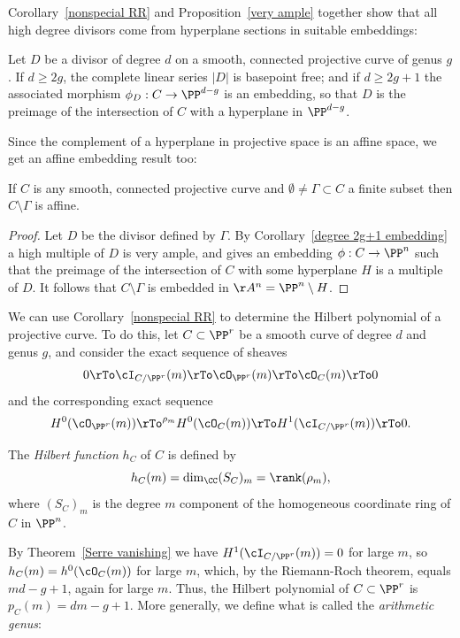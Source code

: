 Corollary~\ref{nonspecial RR} and Proposition~\ref{very ample} together show that all high degree divisors come from hyperplane sections in 
suitable embeddings:

\begin{corollary}\label{degree 2g+1 embedding}
Let $D$ be a divisor of degree $d$ on a smooth, connected projective curve of genus $g$. If $d \geq 2g$, the complete linear series $|D|$ is basepoint free; and if $d \geq 2g+1$ the associated morphism $\phi_D : C \to \PP^{d-g}$ is an embedding, so that
$D$ is the preimage of the intersection of $C$ with a hyperplane in $ \PP^{d-g}$.
\end{corollary}

Since the complement of a hyperplane in projective space is an affine space, we get an affine embedding result too:

\begin{corollary}
 If $C$ is any smooth, connected projective curve and $\emptyset \neq \Gamma \subset C$ a finite subset then $C \setminus \Gamma$ is affine.
\end{corollary}
\begin{proof}
Let $D$ be the divisor defined by $\Gamma$. By Corollary~\ref{degree 2g+1 embedding} a high multiple of $D$ is very ample,
and gives an embedding $\phi: C\to \PP^n$ such that the preimage of the intersection of $C$ with some hyperplane $H$
is a multiple of $D$. It follows that $C\setminus \Gamma$ is embedded in $\AA^n = \PP^n\setminus H$.
\end{proof}
 
We can  use Corollary~\ref{nonspecial RR} to determine the Hilbert polynomial of a projective curve. To do this, let $C \subset \PP^r$ be a smooth curve of degree $d$ and genus $g$, and consider the exact sequence of sheaves
$$
0 \rTo \cI_{C/\PP^r}(m) \rTo \cO_{\PP^r}(m) \rTo \cO_C(m) \rTo 0
$$
and the corresponding exact sequence
$$
 H^0(\cO_{\PP^r}(m)) \rTo^{\rho_m} H^0(\cO_C(m)) \rTo H^1(\cI_{C/\PP^r}(m)) \rTo 0.
$$

The \emph{Hilbert function} $h_C$ of $C$  is defined by
$$
h_C(m) = \dim_{\CC} (S_{C})_{m} = \rank(\rho_m),
$$
where $(S_{C})_{m}$ is the degree $m$ component of the homogeneous coordinate ring of $C$ in $\PP^n$.

By Theorem~\ref{Serre vanishing} we have $H^1(\cI_{C/\PP^r}(m)) = 0$ for large $m$, so $h_{C}(m) = h^0(\cO_C(m))$ for large $m$, which, by the Riemann-Roch theorem, equals $md-g+1$, again for large $m$. Thus, the Hilbert polynomial of $C \subset \PP^r$ is $p_C(m) = dm-g+1$. 
More generally, we define what is called the \emph{arithmetic genus}:

